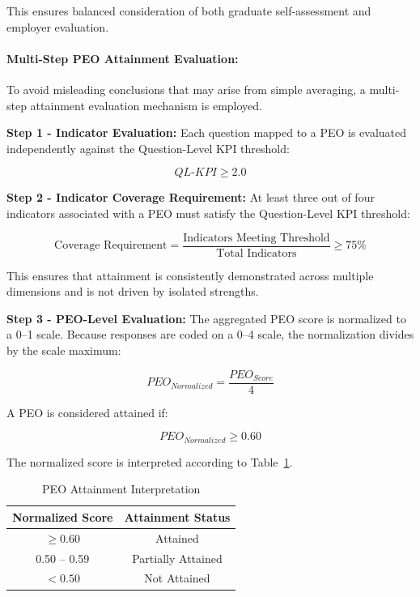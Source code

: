 This ensures balanced consideration of both graduate self-assessment and employer evaluation.

\paragraph{Multi-Step PEO Attainment Evaluation:}
To avoid misleading conclusions that may arise from simple averaging, a multi-step attainment evaluation mechanism is employed.

\textbf{Step 1 - Indicator Evaluation:} Each question mapped to a PEO is evaluated independently against the Question-Level KPI threshold:

\begin{equation}
QL\text{-}KPI \geq 2.0
\end{equation}

\textbf{Step 2 - Indicator Coverage Requirement:} At least three out of four indicators associated with a PEO must satisfy the Question-Level KPI threshold:

\begin{equation}
\text{Coverage Requirement} = \frac{\text{Indicators Meeting Threshold}}{\text{Total Indicators}}
\geq 75\%
\end{equation}

This ensures that attainment is consistently demonstrated across multiple dimensions and is not driven by isolated strengths.

\textbf{Step 3 - PEO-Level Evaluation:} The aggregated PEO score is normalized to a 0--1 scale. Because responses are coded on a 0--4 scale, the normalization divides by the scale maximum:

\begin{equation}
PEO_{Normalized}=
\frac{PEO_{Score}}{4}
\end{equation}

A PEO is considered attained if:

\begin{equation}
PEO_{Normalized}\geq0.60
\end{equation}

The normalized score is interpreted according to Table~\ref{tab:peo_interpretation}.

\begin{table}[htbp]
\centering
\caption{PEO Attainment Interpretation}
\begin{tabular}{|c|c|}
\hline
\textbf{Normalized Score} & \textbf{Attainment Status} \\
\hline
$\geq 0.60$ & Attained \\
\hline
0.50 -- 0.59 & Partially Attained \\
\hline
$<0.50$ & Not Attained \\
\hline
\end{tabular}
\label{tab:peo_interpretation}
\end{table}


